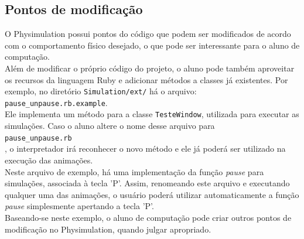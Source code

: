 \subsection{Pontos de modificação}

O Physimulation possui pontos do código que podem ser modificados de acordo com o comportamento físico desejado, o que pode ser interessante para o aluno de computação. \\

Além de modificar o próprio código do projeto, o aluno pode também aproveitar os recursos da linguagem Ruby e adicionar métodos a classes já existentes. Por exemplo, no diretório {\tt Simulation/ext/} há o arquivo: \\

  {\tt pause\_unpause.rb.example}. \\

\noindent Ele implementa um método para a classe {\tt TesteWindow}, utilizada para executar as simulações. Caso o aluno altere o nome desse arquivo para \\

  {\tt pause\_unpause.rb} \\

\noindent , o interpretador irá reconhecer o novo método e ele já poderá ser utilizado na execução das animações. \\

Neste arquivo de exemplo, há uma implementação da função \textit{pause} para simulações, associada à tecla 'P'. Assim, renomeando este arquivo e executando qualquer uma das animações, o usuário poderá utilizar automaticamente a função \textit{pause} simplesmente apertando a tecla 'P'. \\

Baseando-se neste exemplo, o aluno de computação pode criar outros pontos de modificação no Physimulation, quando julgar apropriado.

